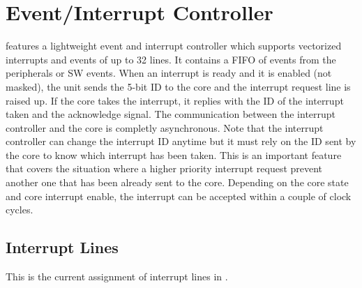 \section{Event/Interrupt Controller}

\pulpissimo features a lightweight event and interrupt controller which supports
vectorized interrupts and events of up to 32 lines. It contains a FIFO of events
from the peripherals or SW events. When an interrupt is ready and it is enabled
(not masked), the unit sends the 5-bit ID to the core and the interrupt request
line is raised up. If the core takes the interrupt, it replies with the ID of
the interrupt taken and the acknowledge signal. The communication between the
interrupt controller and the core is completly asynchronous. Note that the
interrupt controller can change the interrupt ID anytime but it must rely on the
ID sent by the core to know which interrupt has been taken. This is an important
feature that covers the situation where a higher priority interrupt request
prevent another one that has been already sent to the core. Depending on the
core state and core interrupt enable, the interrupt can be accepted within a
couple of clock cycles.

\subsection{Interrupt Lines}
This is the current assignment of interrupt lines in \pulpissimo.

